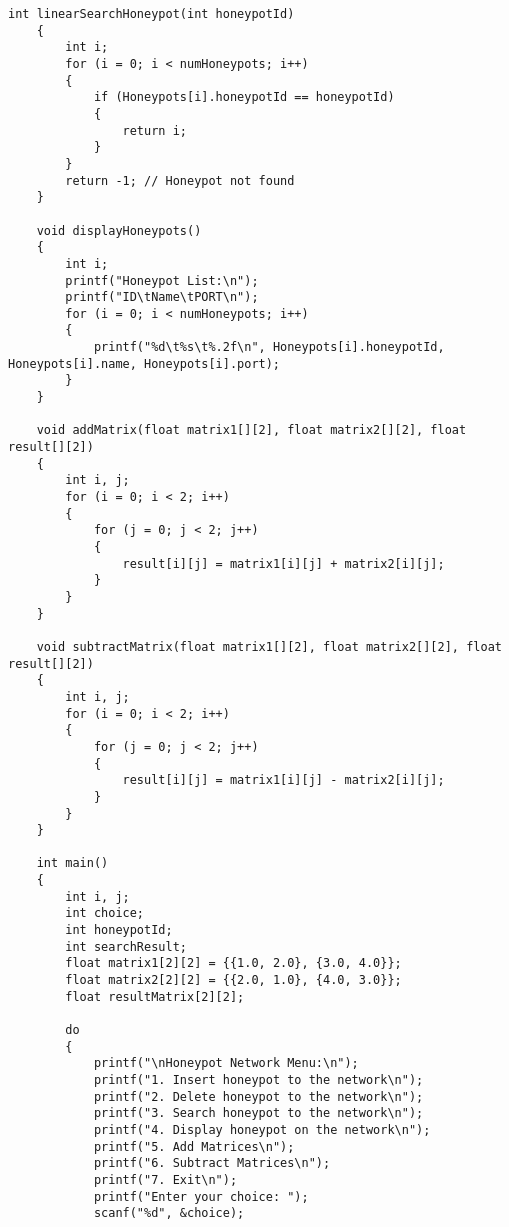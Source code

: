\documentclass{article}
\begin{document}
\begin{lstlisting}[style=CStyle]
    int linearSearchHoneypot(int honeypotId)
    {
        int i;
        for (i = 0; i < numHoneypots; i++)
        {
            if (Honeypots[i].honeypotId == honeypotId)
            {
                return i;
            }
        }
        return -1; // Honeypot not found
    }
    
    void displayHoneypots()
    {
        int i;
        printf("Honeypot List:\n");
        printf("ID\tName\tPORT\n");
        for (i = 0; i < numHoneypots; i++)
        {
            printf("%d\t%s\t%.2f\n", Honeypots[i].honeypotId, Honeypots[i].name, Honeypots[i].port);
        }
    }
    
    void addMatrix(float matrix1[][2], float matrix2[][2], float result[][2])
    {
        int i, j;
        for (i = 0; i < 2; i++)
        {
            for (j = 0; j < 2; j++)
            {
                result[i][j] = matrix1[i][j] + matrix2[i][j];
            }
        }
    }
    
    void subtractMatrix(float matrix1[][2], float matrix2[][2], float result[][2])
    {
        int i, j;
        for (i = 0; i < 2; i++)
        {
            for (j = 0; j < 2; j++)
            {
                result[i][j] = matrix1[i][j] - matrix2[i][j];
            }
        }
    }
    
    int main()
    {
        int i, j;
        int choice;
        int honeypotId;
        int searchResult;
        float matrix1[2][2] = {{1.0, 2.0}, {3.0, 4.0}};
        float matrix2[2][2] = {{2.0, 1.0}, {4.0, 3.0}};
        float resultMatrix[2][2];
    
        do
        {
            printf("\nHoneypot Network Menu:\n");
            printf("1. Insert honeypot to the network\n");
            printf("2. Delete honeypot to the network\n");
            printf("3. Search honeypot to the network\n");
            printf("4. Display honeypot on the network\n");
            printf("5. Add Matrices\n");
            printf("6. Subtract Matrices\n");
            printf("7. Exit\n");
            printf("Enter your choice: ");
            scanf("%d", &choice);
    

\end{lstlisting}
\end{document}
